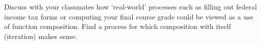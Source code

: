 {Discuss with your classmates how `real-world' processes such as filling out federal income tax forms or computing your final course grade could be viewed as a use of function composition.  Find a process for which composition with itself (iteration) makes sense.
}
{}